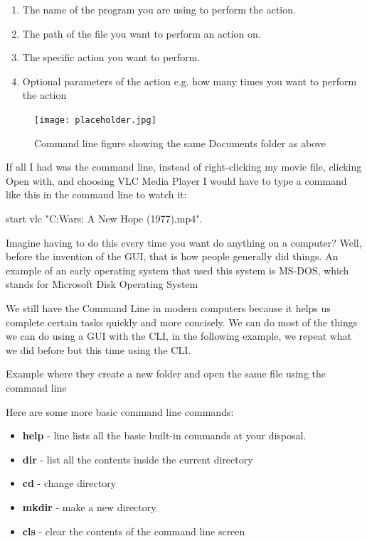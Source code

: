 \begin{enumerate}
\item The name of the program you are using to perform the action.
\item The path of the file you want to perform an action on.
\item The specific action you want to perform.
\item Optional parameters of the action e.g. how many times you want to perform the action
\end{enumerate}

\begin{figure}[h]
\centering\texttt{[image: placeholder.jpg]}
\caption{ Command line figure showing the same Documents folder as above}
\label{fig:cmd} 
\end{figure}

If all I had was the command line, instead of right-clicking my movie file, clicking Open with, and choosing VLC Media Player I would have to type a command like this in the command line to watch it:

\begin{cmd}
start vlc "C:\Users\ZimCode\Documents\Star Wars: A New Hope (1977).mp4".
\end{cmd}

Imagine having to do this every time you want do anything on a computer? Well, before the invention of the GUI, that is how people generally did things. An example of an early operating system that used this system is MS-DOS, which stands for Microsoft Disk Operating System

We still have the Command Line in modern computers because it helps us complete certain tasks quickly and more concisely. We can do most of the things we can do using a GUI with the CLI, in the following example, we repeat what we did before but this time using the CLI.

\begin{example}
Example where they create a new folder and open the same file using the command line
\end{example}

Here are some more basic command line commands:

\begin{itemize}
\item \textbf{help} - line lists all the basic built-in commands at your disposal.
\item \textbf{dir} - list all the contents inside the current directory
\item \textbf{cd} - change directory
\item \textbf{mkdir} - make a new directory
\item \textbf{cls} - clear the contents of the command line screen
\end{itemize}


